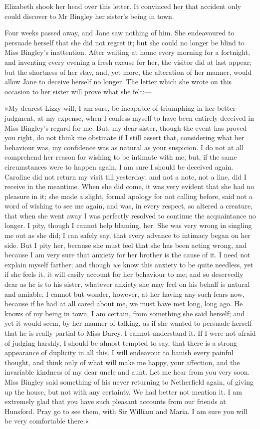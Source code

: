 Elizabeth shook her head over this letter. It convinced her that accident only could discover to Mr Bingley her sister's being in town.

Four weeks passed away, and Jane saw nothing of him. She endeavoured to persuade herself that she did not regret it; but she could no longer be blind to Miss Bingley's inattention. After waiting at home every morning for a fortnight, and inventing every evening a fresh excuse for her, the visitor did at last appear; but the shortness of her stay, and, yet more, the alteration of her manner, would allow Jane to deceive herself no longer. The letter which she wrote on this occasion to her sister will prove what she felt:—

»My dearest Lizzy will, I am sure, be incapable of triumphing in her better judgment, at my expense, when I confess myself to have been entirely deceived in Miss Bingley's regard for me. But, my dear sister, though the event has proved you right, do not think me obstinate if I still assert that, considering what her behaviour was, my confidence was as natural as your suspicion. I do not at all comprehend her reason for wishing to be intimate with me; but, if the same circumstances were to happen again, I am sure I should be deceived again. Caroline did not return my visit till yesterday; and not a note, not a line, did I receive in the meantime. When she did come, it was very evident that she had no pleasure in it; she made a slight, formal apology for not calling before, said not a word of wishing to see me again, and was, in every respect, so altered a creature, that when she went away I was perfectly resolved to continue the acquaintance no longer. I pity, though I cannot help blaming, her. She was very wrong in singling me out as she did; I can safely say, that every advance to intimacy began on her side. But I pity her, because she must feel that she has been acting wrong, and because I am very sure that anxiety for her brother is the cause of it. I need not explain myself farther; and though \textit{we} know this anxiety to be quite needless, yet if she feels it, it will easily account for her behaviour to me; and so deservedly dear as he is to his sister, whatever anxiety she may feel on his behalf is natural and amiable. I cannot but wonder, however, at her having any such fears now, because if he had at all cared about me, we must have met long, long ago. He knows of my being in town, I am certain, from something she said herself; and yet it would seem, by her manner of talking, as if she wanted to persuade herself that he is really partial to Miss Darcy. I cannot understand it. If I were not afraid of judging harshly, I should be almost tempted to say, that there is a strong appearance of duplicity in all this. I will endeavour to banish every painful thought, and think only of what will make me happy, your affection, and the invariable kindness of my dear uncle and aunt. Let me hear from you very soon. Miss Bingley said something of his never returning to Netherfield again, of giving up the house, but not with any certainty. We had better not mention it. I am extremely glad that you have such pleasant accounts from our friends at Hunsford. Pray go to see them, with Sir William and Maria. I am sure you will be very comfortable there.«

